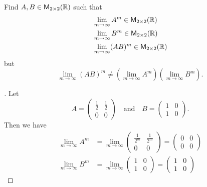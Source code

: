 \begin{ex}\label{ex:5.3.5}
	Find \(A, B \in \mathsf{M}_{{2} \times 2}({\mathbb{R}})\) such that
	\begin{align*}
		 & \lim_{m \to \infty} A^m \in \mathsf{M}_{{2} \times 2}({\mathbb{R}})    \\
		 & \lim_{m \to \infty} B^m \in \mathsf{M}_{{2} \times 2}({\mathbb{R}})    \\
		 & \lim_{m \to \infty} (AB)^m \in \mathsf{M}_{{2} \times 2}({\mathbb{R}})
	\end{align*}
	but
	\[
		\lim_{m \to \infty} (AB)^m \neq (\lim_{m \to \infty} A^m) (\lim_{m \to \infty} B^m).
	\]
\end{ex}

\begin{proof}[]
	Let
	\[
		A = \begin{pmatrix}
			\frac{1}{2} & \frac{1}{2} \\
			0           & 0
		\end{pmatrix} \quad \text{and} \quad B = \begin{pmatrix}
			1 & 0 \\
			1 & 0
		\end{pmatrix}.
	\]
	Then we have
	\begin{align*}
		\lim_{m \to \infty} A^m    & = \lim_{m \to \infty} \begin{pmatrix}
			                                                   \frac{1}{2^m} & \frac{1}{2^m} \\
			                                                   0             & 0
		                                                   \end{pmatrix} = \begin{pmatrix}
			                                                                   0 & 0 \\
			                                                                   0 & 0
		                                                                   \end{pmatrix} \\
		\lim_{m \to \infty} B^m    & = \lim_{m \to \infty} \begin{pmatrix}
			                                                   1 & 0 \\
			                                                   1 & 0
		                                                   \end{pmatrix} = \begin{pmatrix}
			                                                                   1 & 0 \\
			                                                                   1 & 0

\end{pmatrix}
\end{align*}
\end{proof}
